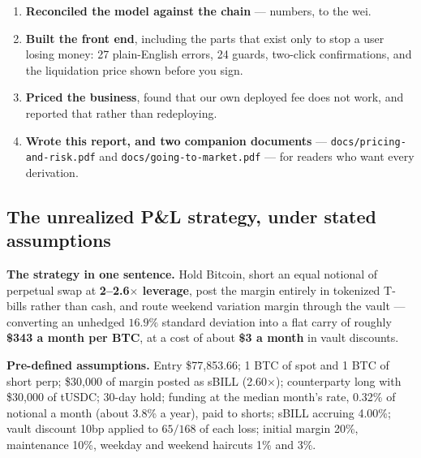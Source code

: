 \documentclass[11pt,a4paper]{article}
\newcommand{\cbox}[1]{%
  \begin{center}\colorbox{panel}{\parbox{0.95\textwidth}{\vspace{3pt}#1\vspace{3pt}}}\end{center}}
\begin{document}
\begin{enumerate}
  funding, and eleven years of T-bill yields, with every judgement call in one config file.
  \item \textbf{Reconciled the model against the chain} --- \reconCount{} numbers, to the wei.
  \item \textbf{Built the front end}, including the parts that exist only to stop a user losing
  money: 27 plain-English errors, 24 guards, two-click confirmations, and the liquidation price shown
  before you sign.
  \item \textbf{Priced the business}, found that our own deployed fee does not work, and reported
  that rather than redeploying.
  \item \textbf{Wrote this report, and two companion documents} --- \texttt{docs/pricing-and-risk.pdf}
  and \texttt{docs/going-to-market.pdf} --- for readers who want every derivation.
\end{enumerate}

\subsection{The unrealized P\&L strategy, under stated assumptions}\label{sec:pnlstrategy}

\cbox{\textbf{The strategy in one sentence.} Hold Bitcoin, short an equal notional of perpetual swap
at \textbf{2--2.6$\times$ leverage}, post the margin entirely in tokenized T-bills rather than cash,
and route weekend variation margin through the vault --- converting an unhedged $16.9\%$ standard
deviation into a flat carry of roughly \textbf{\$343 a month per BTC}, at a cost of about
\textbf{\$3 a month} in vault discounts.}

\textbf{Pre-defined assumptions.} Entry \$77,853.66; 1 BTC of spot and 1 BTC of short perp;
\$30,000 of margin posted as sBILL (2.60$\times$); counterparty long with \$30,000 of tUSDC; 30-day
hold; funding at the median month's rate, 0.32\% of notional a month (about 3.8\% a year), paid to
shorts; sBILL accruing 4.00\%; vault
discount 10bp applied to $65/168$ of each loss; initial margin 20\%, maintenance 10\%, weekday and
weekend haircuts 1\% and 3\%.
\end{document}
